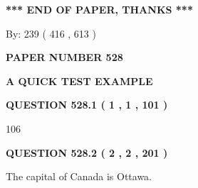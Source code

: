 \documentclass[12pt]{article}
\begin{document}
 
 
 
   
   
 \vspace{0.2in}
 
   
   
   
   
\vspace{1.0in} 
{\textbf{\large{ *** END OF PAPER, THANKS *** }}} 
   
   
\hspace{1.0in} By: 
 239 ( 416 ,  613 )
   
   
   
   
\newpage 
\setcounter{page}{ 
   528001 } 
   
   
   
   
 {\textbf{ \Large{ PAPER NUMBER  528  }}}
   
   
\vspace{0.2in}
   
   
   
   
   
   
 \vspace{0.2in}
{\LARGE {\textbf{ A QUICK TEST EXAMPLE}}}
   
   
  
\vspace{0.2in}
  
{\textbf{\Large{QUESTION
528.1 
 ( 1 , 1 , 101 )
}}}
  
  
 
 
\noindent{}

106
 
 
  
\vspace{0.2in}
  
{\textbf{\Large{QUESTION
528.2 
 ( 2 , 2 , 201 )
}}}
  
  
 
 
\noindent{}
 
 
The capital of Canada is Ottawa.
 
 
 
 
   
   
 \vspace{0.2in}
 
   
   
   
   
\end{document}
